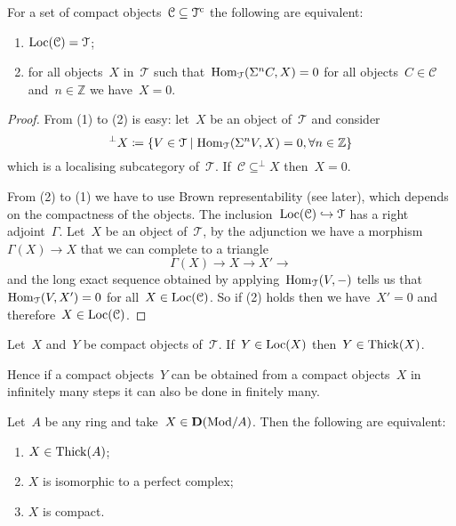 \documentclass[10pt,a4paper]{article}
\begin{document}
\begin{proposition}
  For a set of compact objects~$\mathcal{C}\subseteq\mathcal{T}^{\mathrm{c}}$ the following are equivalent:
  \begin{enumerate}
    \item $\operatorname{Loc}(\mathcal{C})=\mathcal{T}$;
    \item for all objects~$X$ in~$\mathcal{T}$ such that~$\operatorname{Hom}_{\mathcal{T}}(\Sigma^nC,X)=0$ for all objects~$C\in\mathcal{C}$ and~$n\in\mathbb{Z}$ we have~$X=0$.
  \end{enumerate}

  \begin{proof}
    From (1) to (2) is easy: let~$X$ be an object of~$\mathcal{T}$ and consider
    \begin{equation}
      {}^\perp X\coloneqq\left\{ V\in\mathcal{T}\mid\operatorname{Hom}_{\mathcal{T}}(\Sigma^nV,X)=0,\forall n\in\mathbb{Z} \right\}
    \end{equation}
    which is a localising subcategory of~$\mathcal{T}$. If~$\mathcal{C}\subseteq^\perp X$ then~$X=0$.

    From (2) to (1) we have to use Brown representability (see later), which depends on the compactness of the objects. The inclusion~$\operatorname{Loc}(\mathcal{C})\hookrightarrow\mathcal{T}$ has a right adjoint~$\Gamma$. Let~$X$ be an object of~$\mathcal{T}$, by the adjunction we have a morphism~$\Gamma(X)\to X$ that we can complete to a triangle
    \begin{equation}
      \Gamma(X)\to X\to X'\to
    \end{equation}
    and the long exact sequence obtained by applying~$\operatorname{Hom}_{\mathcal{T}}(V,-)$ tells us that~$\operatorname{Hom}_{\mathcal{T}}(V,X')=0$ for all~$X\in\operatorname{Loc}(\mathcal{C})$. So if (2) holds then we have~$X'=0$ and therefore~$X\in\operatorname{Loc}(\mathcal{C})$.%
  \end{proof}
\end{proposition}
\begin{proposition}
  Let~$X$ and~$Y$ be compact objects of~$\mathcal{T}$. If~$Y\in\operatorname{Loc}(X)$ then~$Y\in\operatorname{Thick}(X)$.
\end{proposition}
Hence if a compact objects~$Y$ can be obtained from a compact objects~$X$ in infinitely many steps it can also be done in finitely many.
\begin{example}
  Let~$A$ be any ring and take~$X\in\mathbf{D}(\mathrm{Mod}/A)$. Then the following are equivalent:
  \begin{enumerate}
    \item $X\in\operatorname{Thick}(A)$;
    \item $X$ is isomorphic to a perfect complex;
    \item $X$ is compact.
  \end{enumerate}
\end{example}
\end{document}
